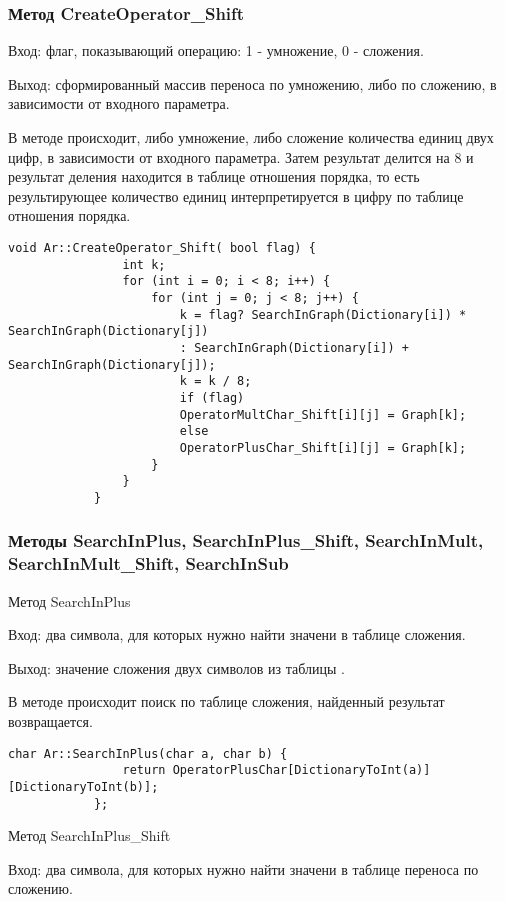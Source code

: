 \documentclass[10pt,a4paper,final]{article} %
\begin{document}
		\subsubsection{Метод CreateOperator\_Shift}
			Вход: флаг, показывающий операцию: 1 - умножение, 0 - сложения. 
		
		Выход: сформированный массив переноса по умножению, либо по сложению, в зависимости от входного параметра.
		
		В методе происходит, либо умножение, либо сложение количества единиц двух цифр, в зависимости от входного параметра. Затем результат делится на 8 и результат деления находится в таблице отношения порядка, то есть результирующее количество единиц интерпретируется в цифру по таблице отношения порядка.
					
		\begin{lstlisting}[caption={Метод CreateOperator\_Shift}]
			void Ar::CreateOperator_Shift( bool flag) {
				int k;
				for (int i = 0; i < 8; i++) {
					for (int j = 0; j < 8; j++) {
						k = flag? SearchInGraph(Dictionary[i]) * SearchInGraph(Dictionary[j]) 
						: SearchInGraph(Dictionary[i]) + SearchInGraph(Dictionary[j]);
						k = k / 8;
						if (flag)
						OperatorMultChar_Shift[i][j] = Graph[k];
						else
						OperatorPlusChar_Shift[i][j] = Graph[k];
					}
				}
			}
		\end{lstlisting}
		
		\subsubsection{Методы SearchInPlus, SearchInPlus\_Shift, SearchInMult, SearchInMult\_Shift, SearchInSub}
		
		Метод SearchInPlus
		
		Вход: два символа, для которых нужно найти значени в таблице сложения.
		
		Выход: значение сложения двух символов из таблицы .
		
		В методе происходит поиск по таблице сложения, найденный результат возвращается.
		
			\begin{lstlisting}[caption={Метод SearchInPlus}]
			char Ar::SearchInPlus(char a, char b) {
				return OperatorPlusChar[DictionaryToInt(a)][DictionaryToInt(b)];
			};
		\end{lstlisting}
		
				Метод SearchInPlus\_Shift
		
		Вход: два символа, для которых нужно найти значени в таблице переноса по сложению.
		
\end{document}
